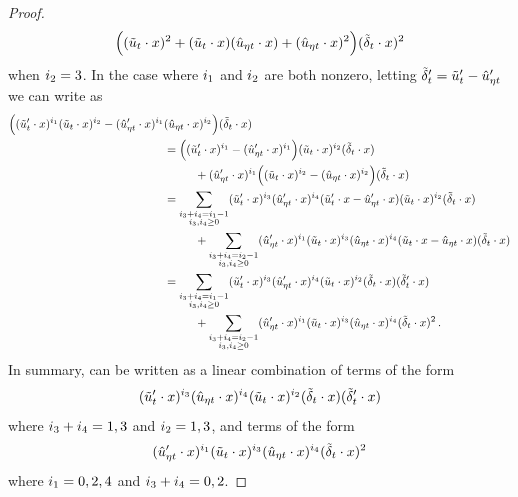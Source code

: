 \begin{proof}
\begin{align}
\Big((\tilde{u}_t \cdot x)^2 + (\tilde{u}_t \cdot x)(\hat{u}_{\eta t} \cdot x) + (\hat{u}_{\eta t} \cdot x)^2 \Big) ({\tilde{\delta}}_t \cdot x)^2
\end{align}
when $i_{2} = 3$. In the case where $i_{1}$ and $i_{2}$ are both nonzero, letting ${\tilde{\delta}}_t' = \tilde{u}_t' - \hat{u}_{\eta t}'$ we can write  as 
\begin{align}
\Big((\tilde{u}_t' \cdot x)^{i_{1}} (\tilde{u}_t \cdot x)^{i_{2}} - (\hat{u}_{\eta t}' \cdot x)^{i_{1}} & (\hat{u}_{\eta t} \cdot x)^{i_{2}} \Big) ({\tilde{\delta}}_t \cdot x) \\
& = \Big((\tilde{u}_t' \cdot x)^{i_{1}} - (\hat{u}_{\eta t}' \cdot x)^{i_{1}} \Big) (\tilde{u}_t \cdot x)^{i_{2}} ({\tilde{\delta}}_t \cdot x) \\
& \,\,\,\,\,\,\,\,\,\,\,\,\,\,\,\, + (\hat{u}_{\eta t}' \cdot x)^{i_{1}} \Big((\tilde{u}_t \cdot x)^{i_{2}} - (\hat{u}_{\eta t} \cdot x)^{i_{2}} \Big) ({\tilde{\delta}}_t \cdot x) \\
& = \sum_{\substack{i_{3} + i_{4} = i_{1} - 1 \\ i_{3}, i_{4} \geq 0}} (\tilde{u}_t' \cdot x)^{i_{3}} (\hat{u}_{\eta t}' \cdot x)^{i_{4}} (\tilde{u}_t' \cdot x - \hat{u}_{\eta t}' \cdot x) (\tilde{u}_t \cdot x)^{i_{2}} ({\tilde{\delta}}_t \cdot x) \\
& \,\,\,\,\,\,\,\,\,\,\,\,\,\,\,\, + \sum_{\substack{i_{3} + i_{4} = i_{2} - 1 \\ i_{3}, i_{4} \geq 0}} (\hat{u}_{\eta t}' \cdot x)^{i_{1}} (\tilde{u}_t \cdot x)^{i_{3}} (\hat{u}_{\eta t} \cdot x)^{i_{4}} (\tilde{u}_t \cdot x - \hat{u}_{\eta t} \cdot x) ({\tilde{\delta}}_t \cdot x) \\
& = \sum_{\substack{i_{3} + i_{4} = i_{1} - 1 \\ i_{3}, i_{4} \geq 0}} (\tilde{u}_t' \cdot x)^{i_{3}} (\hat{u}_{\eta t}' \cdot x)^{i_{4}} (\tilde{u}_t \cdot x)^{i_{2}} ({\tilde{\delta}}_t \cdot x)({\tilde{\delta}}_t' \cdot x) \\
& \,\,\,\,\,\,\,\,\,\,\,\,\,\,\,\, + \sum_{\substack{i_{3} + i_{4} = i_{2} - 1 \\ i_{3}, i_{4} \geq 0}} (\hat{u}_{\eta t}' \cdot x)^{i_{1}} (\tilde{u}_t \cdot x)^{i_{3}} (\hat{u}_{\eta t} \cdot x)^{i_{4}} ({\tilde{\delta}}_t \cdot x)^2 \,.
\end{align}
In summary,  can be written as a linear combination of terms of the form
\begin{align} \label{eq:single_term_type1}
(\tilde{u}_t' \cdot x)^{i_{3}} (\hat{u}_{\eta t} \cdot x)^{i_{4}} (\tilde{u}_t \cdot x)^{i_{2}} ({\tilde{\delta}}_t \cdot x)({\tilde{\delta}}_t' \cdot x)
\end{align}
where $i_{3} + i_{4} = 1, 3$ and $i_{2} = 1, 3$, and terms of the form
\begin{align} \label{eq:single_term_type2}
(\hat{u}_{\eta t}' \cdot x)^{i_{1}} (\tilde{u}_t \cdot x)^{i_{3}} (\hat{u}_{\eta t} \cdot x)^{i_{4}} ({\tilde{\delta}}_t \cdot x)^2
\end{align}
where $i_{1} = 0, 2, 4$ and $i_{3} + i_{4} = 0, 2$.


\end{proof}
